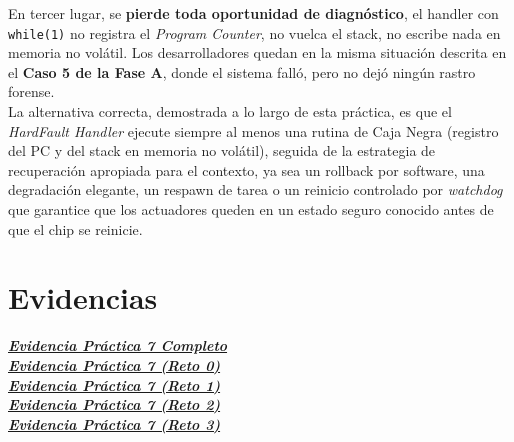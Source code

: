 \documentclass[12pt,letterpaper]{article}
\begin{document}
En tercer lugar, se \textbf{pierde toda oportunidad de diagnóstico}, el handler con \texttt{while(1)} no
registra el \textit{Program Counter}, no vuelca el stack, no escribe nada en memoria no volátil. Los
desarrolladores quedan en la misma situación descrita en el \textbf{Caso 5 de la Fase A}, donde el sistema falló,
pero no dejó ningún rastro forense.\\
 
La alternativa correcta, demostrada a lo largo de esta práctica, es que el \textit{HardFault Handler} ejecute
siempre al menos una rutina de Caja Negra (registro del PC y del stack en memoria no volátil), seguida de la
estrategia de recuperación apropiada para el contexto, ya sea un rollback por software, una degradación elegante,
un respawn de tarea o un reinicio controlado por \textit{watchdog} que garantice que los actuadores queden en un
estado seguro conocido antes de que el chip se reinicie.

\bigskip

\section*{Evidencias}

\href{https://drive.google.com/file/d/1Hh8ghAZ_HhTtK0zuvYGGHo4ie9aAXv0f/view?usp=sharing}
     {\textbf{\textit{\textcolor{linkblue}{Evidencia Práctica 7 Completo}}}}\\

\href{https://drive.google.com/file/d/1Hh8ghAZ_HhTtK0zuvYGGHo4ie9aAXv0f/view?usp=sharing&t=56.761}
     {\textbf{\textit{\textcolor{linkblue}{Evidencia Práctica 7 (Reto 0)}}}}\\

\href{https://drive.google.com/file/d/1Hh8ghAZ_HhTtK0zuvYGGHo4ie9aAXv0f/view?usp=sharing&t=90.74}
     {\textbf{\textit{\textcolor{linkblue}{Evidencia Práctica 7 (Reto 1)}}}}\\

\href{https://drive.google.com/file/d/1Hh8ghAZ_HhTtK0zuvYGGHo4ie9aAXv0f/view?usp=sharing&t=140.848}
     {\textbf{\textit{\textcolor{linkblue}{Evidencia Práctica 7 (Reto 2)}}}}\\

\href{https://drive.google.com/file/d/1Hh8ghAZ_HhTtK0zuvYGGHo4ie9aAXv0f/view?usp=sharing&t=199.448}
     {\textbf{\textit{\textcolor{linkblue}{Evidencia Práctica 7 (Reto 3)}}}}\\

     
\newpage
\end{document}
